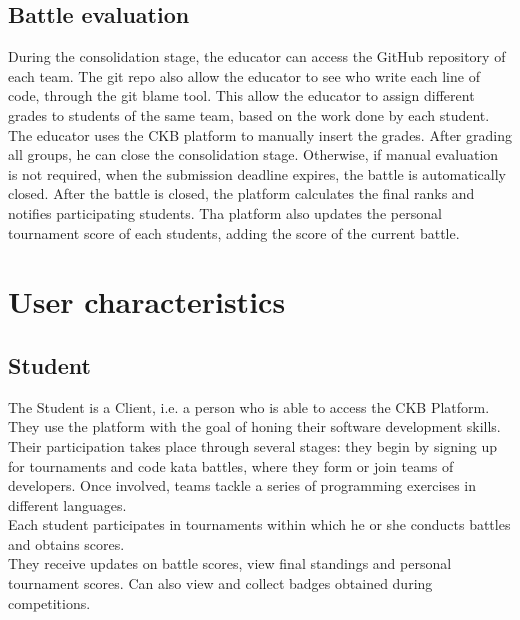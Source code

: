 \subsection{Battle evaluation}
During the consolidation stage, the educator can access the GitHub repository of each team.
The git repo also allow the educator to see who write each line of code, through the git blame tool.
This allow the educator to assign different grades to students of the same team, based on the work done by each student.
The educator uses the CKB platform to manually insert the grades.
After grading all groups, he can close the consolidation stage.
Otherwise, if manual evaluation is not required, when the submission deadline expires,
the battle is automatically closed.
After the battle is closed, the platform calculates the final ranks and notifies participating students.
Tha platform also updates the personal tournament score of each students, adding the score of the current battle.
\begin{adjustbox}{
		max size={\textwidth}{},
		caption={ Battle evaluation activity diagram},
		label={fig:Battle evaluation activity diagram},
		figure=H}
	\centering
\end{adjustbox}


\section{User characteristics}
\subsection{Student}
The Student is a Client, i.e. a person who is able to access the CKB Platform.\\
They use the platform with the goal of honing their software development skills. Their participation takes place through several stages: they begin by signing up for tournaments and code kata battles, where they form or join teams of developers. Once involved, teams tackle a series of programming exercises in different languages. \\
Each student participates in tournaments within which he or she conducts battles and obtains scores.\\
They receive updates on battle scores, view final standings and personal tournament scores. Can also view and collect badges obtained during competitions.


